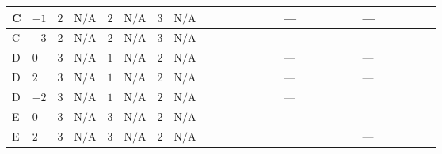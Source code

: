 \documentclass[8pt]{article}
\begin{document}
\begin{landscape}
\begin{longtable}{@{}llcccccc >{\raggedright\arraybackslash}p{0.21\linewidth} >{\raggedright\arraybackslash}p{0.21\linewidth} >{\raggedright\arraybackslash}p{0.21\linewidth}@{}}
\midrule
C & $-1$ & $2$ & $\text{N/A}$ & $2$ & $\text{N/A}$ & $3$ & $\text{N/A}$ & \scriptsize\adjustbox{max width=\linewidth}{$\begin{gathered} +6 {\lambda_{HS_2}^{(1)}} {\lambda_{S_2}^{(1)}}\end{gathered}$} & --- & --- \\
\midrule
C & $-3$ & $2$ & $\text{N/A}$ & $2$ & $\text{N/A}$ & $3$ & $\text{N/A}$ & \scriptsize\adjustbox{max width=\linewidth}{$\begin{gathered} +6 {\lambda_{HS_2}^{(1)}} {\lambda_{S_2}^{(1)}}\end{gathered}$} & --- & --- \\
\midrule
D & $0$ & $3$ & $\text{N/A}$ & $1$ & $\text{N/A}$ & $2$ & $\text{N/A}$ & \scriptsize\adjustbox{max width=\linewidth}{$\begin{gathered} +4 {\lambda_{HS_2}^{(1)}} {\lambda_{S_2}^{(1)}}\end{gathered}$} & --- & --- \\
\midrule
D & $2$ & $3$ & $\text{N/A}$ & $1$ & $\text{N/A}$ & $2$ & $\text{N/A}$ & \scriptsize\adjustbox{max width=\linewidth}{$\begin{gathered} +4 {\lambda_{HS_2}^{(1)}} {\lambda_{S_2}^{(1)}}\end{gathered}$} & --- & --- \\
\midrule
D & $-2$ & $3$ & $\text{N/A}$ & $1$ & $\text{N/A}$ & $2$ & $\text{N/A}$ & \scriptsize\adjustbox{max width=\linewidth}{$\begin{gathered} +4 {\lambda_{HS_2}^{(1)}} {\lambda_{S_2}^{(1)}}\end{gathered}$} & --- & \scriptsize\adjustbox{max width=\linewidth}{$\begin{gathered} +12 {\lambda_{X_{2}}} \left({\lambda_{X_{16}}}\right)^{*}\end{gathered}$} \\
\midrule
E & $0$ & $3$ & $\text{N/A}$ & $3$ & $\text{N/A}$ & $2$ & $\text{N/A}$ & \scriptsize\adjustbox{max width=\linewidth}{$\begin{gathered} +8 {\lambda_{HS_2}^{(1)}} {\lambda_{S_2}^{(1)}}\end{gathered}$} & \scriptsize\adjustbox{max width=\linewidth}{$\begin{gathered} +6 {\lambda_{HS_2}^{(A)}}^2\end{gathered}$} & --- \\
\midrule
E & $2$ & $3$ & $\text{N/A}$ & $3$ & $\text{N/A}$ & $2$ & $\text{N/A}$ & \scriptsize\adjustbox{max width=\linewidth}{$\begin{gathered} +8 {\lambda_{HS_2}^{(1)}} {\lambda_{S_2}^{(1)}}\end{gathered}$} & \scriptsize\adjustbox{max width=\linewidth}{$\begin{gathered} +6 {\lambda_{HS_2}^{(A)}}^2\end{gathered}$} & --- \\

\end{longtable}
\end{landscape}
\end{document}

